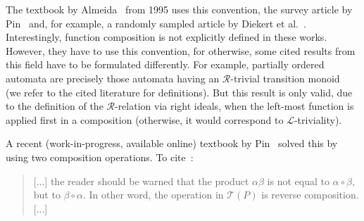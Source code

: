 \begin{enumerate}
	\label{prelim:discussion:Rrelation-fun-comp}
    The textbook by Almeida~\cite{Almeida95} from 1995 uses this convention,
	the survey article by Pin~\cite{DBLP:reference/hfl/Pin97} and, for example, a randomly sampled
	article by Diekert et al.~\cite{DBLP:journals/ijfcs/DiekertGK08}.
	Interestingly, function composition
	is not explicitly defined in these works.
	However, they have to use this convention, for otherwise, some cited results from this field
	have to be formulated differently. For example,
	partially ordered automata 
	are precisely those automata
	having an $\mathcal R$-trivial transition monoid~\cite{DBLP:journals/jcss/BrzozowskiF80}  (we refer to the cited literature for definitions).
	But this result is only valid, due to the definition of the $\mathcal R$-relation via right ideals,
	when the left-most function is applied first in a composition (otherwise, it would correspond
	to $\mathcal L$-triviality).
	
	A recent (work-in-progress, available online) textbook by Pin~\cite{Pin2022} solved this by
	using two composition operations. To cite~\cite[Sect.~II.4.2]{Pin2022}: 
	\begin{quote}
		[...] the reader should be warned that the product $\alpha\beta$ is not equal to $\alpha \circ\beta$,
		but to $\beta \circ \alpha$. In other word, the operation in $\mathcal T(P)$
		is reverse composition. [...]
	\end{quote}   
	


\end{enumerate}

